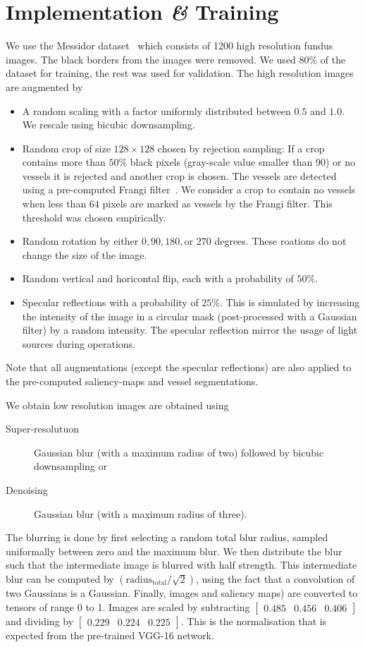 \documentclass{scrartcl}
\begin{document}
\section{Implementation \textit{\&} Training}
We use the Messidor dataset~\cite{Messidor} which consists of 1200 high resolution fundus images.
The black borders from the images were removed.
We used 80\% of the dataset for training, the rest was used for validation.
The high resolution images are augmented by
\begin{itemize}
\item A random scaling with a factor uniformly distributed between $0.5$ and $1.0$.
  We rescale using bicubic downsampling.
\item Random crop of size $128 \times 128$ chosen by rejection sampling:
If a crop contains more than $50\%$ black pixels (gray-scale value smaller than 90) or no vessels it is rejected and another crop is chosen.
The vessels are detected using a pre-computed Frangi filter~\cite{Frangi}.
We consider a crop to contain no vessels when less than $64$ pixels are marked as vessels by the Frangi filter.
This threshold was chosen empirically.
\item Random rotation by either $0, 90, 180, \text{or } 270$ degrees.
  These roations do not change the size of the image.
\item Random vertical and horicontal flip, each with a probability of $50\%$.
\item Specular reflections with a probability of $25\%$.
This is simulated by increasing the intensity of the image in a circular mask (post-processed with a Gaussian filter) by a random intensity.
The specular reflection mirror the usage of light sources during operations.
\end{itemize}
Note that all augmentations (except the specular reflections) are also applied to the pre-computed saliency-maps and vessel segmentations.

We obtain low resolution images are obtained using
\begin{description}
\item[Super-resolutuon] Gaussian blur (with a maximum radius of two) followed by bicubic downsampling or
\item[Denoising] Gaussian blur (with a maximum radius of three).
\end{description}
The blurring is done by first selecting a random total blur radius, sampled uniformally between zero and the maximum blur.
We then distribute the blur such that the intermediate image is blurred with half strength.
This intermediate blur can be computed by \( \left( \text{radius}_{\text{total}} / \sqrt{2} \right)\), using the fact that a convolution of two Gaussians is a Gaussian.
Finally, images and saliency maps) are converted to tensors of range 0 to 1.
Images are scaled by subtracting
\(
\begin{bmatrix}
 0.485 & 0.456 & 0.406 
\end{bmatrix}
\)
and dividing by
\(
\begin{bmatrix}
0.229 & 0.224& 0.225
\end{bmatrix}
\).
This is the normalisation that is expected from the pre-trained VGG-16 network.
\end{document}

